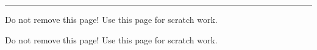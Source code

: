 \documentclass[12pt,addpoints]{exam}
\begin{document}
\begin{center}
    \pointtable[v][questions]
\end{center}

\noindent
\rule[2ex]{\textwidth}{2pt}
\newpage


\clearpage
\begin{questions}

\clearpage

\clearpage

\clearpage

\end{questions}

\clearpage
\begin{center}
Do not remove this page! Use this page for scratch work.
\end{center}
\clearpage
\begin{center}
Do not remove this page! Use this page for scratch work.
\end{center}
\end{document}
